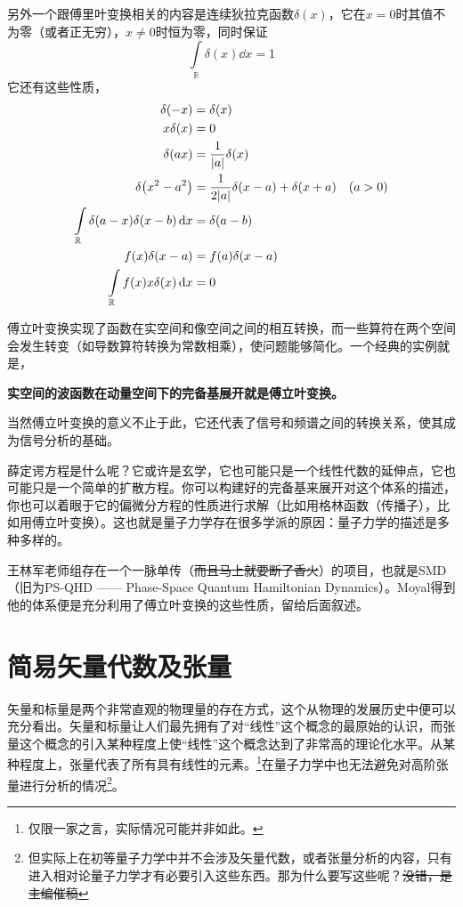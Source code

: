 \documentclass[12pt,a4paper,openany,twoside]{book}
\numberwithin{equation}{section}
\begin{document}
        另外一个跟傅里叶变换相关的内容是连续狄拉克函数$\delta(x)$，它在$x=0$时其值不为零（或者正无穷），$x\neq 0$时恒为零，同时保证
        \begin{equation}
          \int\limits_\mathbb{R}{\delta(x)\dd{x}}=1
        \end{equation}
        它还有这些性质，
        \begin{align}
          \delta\qty(-x)&=\delta\qty(x)\\
          x\delta\qty(x)&=0\\
          \delta\qty(ax)&=\frac{1}{\abs{a}}\delta\qty(x)\\
          \delta\qty(x^2-a^2)&=\frac{1}{2\abs{a}}{\delta\qty(x-a)+\delta\qty(x+a)}\quad\qty(a>0)\\
          \int\limits_\mathbb{R}{\delta\qty(a-x)\delta\qty(x-b)\dd{x}}&=\delta\qty(a-b)\\
          f\qty(x)\delta\qty(x-a)&=f\qty(a)\delta\qty(x-a)\\
          \int\limits_\mathbb{R}{f\qty(x)x\delta\qty(x)\dd{x}}&=0
        \end{align}

        傅立叶变换实现了函数在实空间和像空间之间的相互转换，而一些算符在两个空间会发生转变（如导数算符转换为常数相乘），使问题能够简化。一个经典的实例就是，
        \begin{center}
          \textbf{实空间的波函数在动量空间下的完备基展开就是傅立叶变换。}
        \end{center}
        当然傅立叶变换的意义不止于此，它还代表了信号和频谱之间的转换关系，使其成为信号分析的基础。

        薛定谔方程是什么呢？它或许是玄学，它也可能只是一个线性代数的延伸点，它也可能只是一个简单的扩散方程。你可以构建好的完备基来展开对这个体系的描述，你也可以着眼于它的偏微分方程的性质进行求解（比如用格林函数（传播子），比如用傅立叶变换）。这也就是量子力学存在很多学派的原因：量子力学的描述是多种多样的。

        王林军老师组存在一个一脉单传（\sout{而且马上就要断了香火}）的项目，也就是SMD（旧为PS-QHD —— Phase-Space Quantum Hamiltonian Dynamics）。Moyal得到他的体系便是充分利用了傅立叶变换的这些性质，留给后面叙述。

      \section{简易矢量代数及张量}
        矢量和标量是两个非常直观的物理量的存在方式，这个从物理的发展历史中便可以充分看出。矢量和标量让人们最先拥有了对“线性”这个概念的最原始的认识，而张量这个概念的引入某种程度上使“线性”这个概念达到了非常高的理论化水平。从某种程度上，张量代表了所有具有线性的元素。\footnote{仅限一家之言，实际情况可能并非如此。}在量子力学中也无法避免对高阶张量进行分析的情况\footnote{但实际上在初等量子力学中并不会涉及矢量代数，或者张量分析的内容，只有进入相对论量子力学才有必要引入这些东西。那为什么要写这些呢？\sout{没错，是主编催稿}}。
\end{document}
